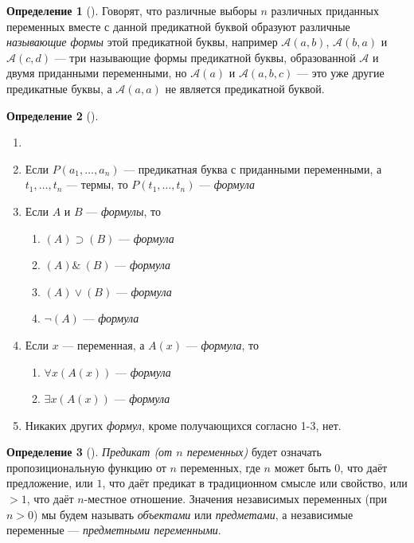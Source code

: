 \documentclass[a4paper, 12pt]{article}  %
\DeclareMathOperator{\conj}{\mathbb{\&}}
\theoremstyle{definition}
\newtheorem*{definition}{Определение}
\begin{document}
	\begin{definition}[]
		Говорят, что различные выборы $n$ различных приданных переменных вместе с данной предикатной
		буквой образуют различные \textit{называющие формы} этой предикатной буквы, например
		$\mathscr{A}(a,b)$, $\mathscr{A}(b,a)$ и $\mathscr{A}(c,d)$ --- три называющие формы
		предикатной буквы, образованной $\mathscr{A}$ и двумя приданными переменными, но
		$\mathscr{A}(a)$ и $\mathscr{A}(a,b,c)$ --- это уже другие предикатные буквы, а
		$\mathscr{A}(a,a)$ не является предикатной буквой.
	\end{definition}

	\begin{definition}[]
		\begin{enumerate}
			\setlength\itemsep{-3pt}	
			\item[{}]
			\item Если $P(a_1, \dots, a_n)$ --- предикатная буква с приданными переменными, а $t_1,
			\dots, t_n$ --- термы, то $P(t_1, \dots, t_n)$ --- \textit{формула}
			\item Если $A$ и $B$ --- \textit{формулы}, то
			\begin{multicols}{3}
				\begin{enumerate}
					\item $(A) \supset (B)$ --- \textit{формула}
					\item $(A) \conj\: (B)$ --- \textit{формула}
					\item $(A) \vee (B)$    --- \textit{формула}
					\item $\neg (A)$        --- \textit{формула}
				\end{enumerate}
			\end{multicols}
			\item Если $x$ --- переменная, а $A(x)$ --- \textit{формула}, то
			\begin{multicols}{3}
				\begin{enumerate}
					\item $\forall x (A(x))$ --- \textit{формула}
					\item $\exists x (A(x))$ --- \textit{формула}
				\end{enumerate}
			\end{multicols}
			\item Никаких других \textit{формул}, кроме получающихся согласно 1-3, нет.
		\end{enumerate}
	\end{definition}

	\begin{definition}[]
		\textit{Предикат (от $n$ переменных)} будет означать пропозициональную функцию от $n$
		переменных, где $n$ может быть $0$, что даёт предложение, или $1$, что даёт предикат в
		традиционном смысле или свойство, или $> 1$, что даёт $n$-местное отношение. Значения
		независимых переменных (при $n > 0$) мы будем называть \textit{объектами} или
		\textit{предметами}, а независимые переменные --- \textit{предметными переменными}. 
	\end{definition}
	
\end{document}
